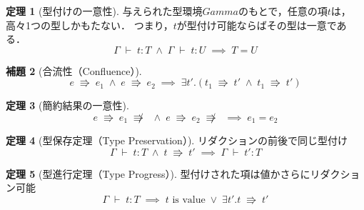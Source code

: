 \documentclass[a4j, dvipdfmx]{jsarticle}
\theoremstyle{definition}
\newtheorem{theo}{定理}
\newtheorem{lem}[theo]{補題}
\newcommand{\sequent}[2]{#1 \;\vdash\; #2}
\newcommand{\reduction}[2]{#1 \;\Rrightarrow\; #2}
\begin{document}
\begin{theo}[型付けの一意性]
与えられた型環境$Gamma$のもとで，任意の項$t$は，高々1つの型しかもたない．
つまり，$t$が型付け可能ならばその型は一意である．
\begin{equation*}
  \sequent{\Gamma}{t:T} \;\land\; \sequent{\Gamma}{t:U} \;\implies\; T = U
\end{equation*}
\end{theo}

\begin{lem}[合流性（Confluence）]
\begin{equation*}
  \reduction{e}{e_1} \;\land\; \reduction{e}{e_2} \;\implies\; \exists t'.(\reduction{t_1}{t'} \;\land\; \reduction{t_1}{t'})
\end{equation*}
\end{lem}

\begin{theo}[簡約結果の一意性]
\begin{equation*}
  e\;\Rrightarrow\;e_1\;\not\Rrightarrow\; \;\land\; e\;\Rrightarrow\;e_2\;\not\Rrightarrow\; \;\implies\; e_1 = e_2
\end{equation*}
\end{theo}

\begin{theo}[型保存定理（Type Preservation）]
リダクションの前後で同じ型付け
\begin{equation*}
  \sequent{\Gamma}{t:T} \;\land\; \reduction{t}{t'} \;\implies\; \sequent{\Gamma}{t':T}
\end{equation*}
\end{theo}

\begin{theo}[型進行定理（Type Progress）]
型付けされた項は値かさらにリダクション可能
\begin{equation*}
  \sequent{\Gamma}{t:T} \;\implies\; \text{$t$ is value} \;\lor\; \exists t'.\reduction{t}{t'}
\end{equation*}
\end{theo}
\end{document}
